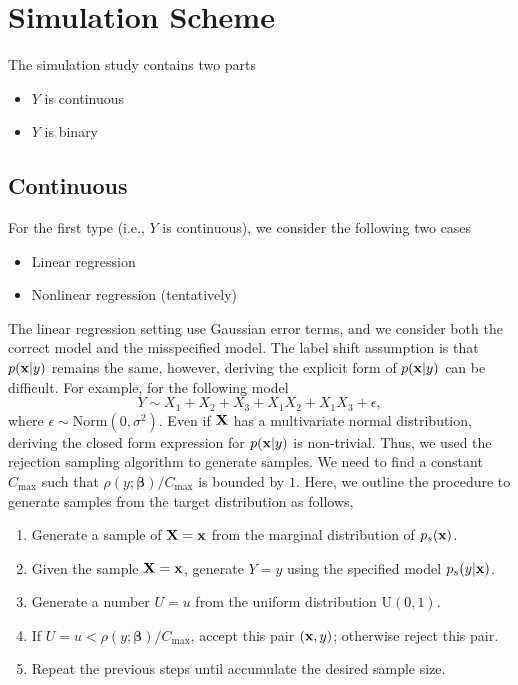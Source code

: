 \documentclass[12pt]{article}
\def\X{{\bf X}}
\def\x{{\bf x}}
\def\bb{{\boldsymbol\beta}}
\begin{document}
\section*{Simulation Scheme}

The simulation study contains two parts
\begin{itemize}
	\item $Y$ is continuous
	\item $Y$ is binary
\end{itemize}

\subsection*{Continuous}
\noindent For the first type (i.e., $Y$ is continuous), we consider the following two cases
\begin{itemize}
	\item Linear regression
	\item Nonlinear regression (tentatively)
\end{itemize}
The linear regression setting use Gaussian error terms, and we consider both the correct model and the misspecified model.
The label shift assumption is that $p(\x|y)$ remains the same, however, deriving the explicit form of $p(\x|y)$ can be difficult.
For example, for the following model
\[
Y\sim X_1+X_2+X_3+X_1X_2+X_1X_3+\epsilon,
\]
where $\epsilon\sim\mathrm{Norm}(0,\sigma^2)$.
Even if $\X$ has a multivariate normal distribution, deriving the closed form expression for $p(\x|y)$ is non-trivial.
Thus, we used the rejection sampling algorithm to generate samples.
We need to find a constant $C_{\max}$ such that $\rho(y;\bb)/C_{\max}$ is bounded by $1$.
Here, we outline the procedure to generate samples from the target distribution as follows,
\begin{enumerate}
	\item Generate a sample of $\X=\x$ from the marginal distribution of $p_s(\x)$.
	\item Given the sample $\X=\x$, generate $Y=y$ using the specified model $p_s(y|\x)$.
	\item Generate a number $U=u$ from the uniform distribution $\mathrm{U}(0,1)$.
	\item If $U=u<\rho(y;\bb)/C_{\max}$, accept this pair $(\x,y)$; otherwise reject this pair.
	\item Repeat the previous steps until accumulate the desired sample size.
\end{enumerate}
\end{document}
